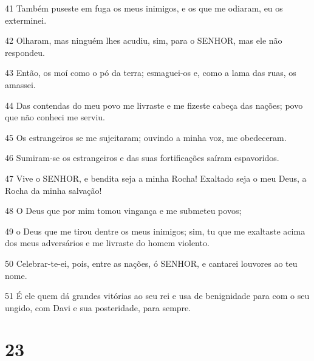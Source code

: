 \par 41 Também puseste em fuga os meus inimigos, e os que me odiaram, eu os exterminei.
\par 42 Olharam, mas ninguém lhes acudiu, sim, para o SENHOR, mas ele não respondeu.
\par 43 Então, os moí como o pó da terra; esmaguei-os e, como a lama das ruas, os amassei.
\par 44 Das contendas do meu povo me livraste e me fizeste cabeça das nações; povo que não conheci me serviu.
\par 45 Os estrangeiros se me sujeitaram; ouvindo a minha voz, me obedeceram.
\par 46 Sumiram-se os estrangeiros e das suas fortificações saíram espavoridos.
\par 47 Vive o SENHOR, e bendita seja a minha Rocha! Exaltado seja o meu Deus, a Rocha da minha salvação!
\par 48 O Deus que por mim tomou vingança e me submeteu povos;
\par 49 o Deus que me tirou dentre os meus inimigos; sim, tu que me exaltaste acima dos meus adversários e me livraste do homem violento.
\par 50 Celebrar-te-ei, pois, entre as nações, ó SENHOR, e cantarei louvores ao teu nome.
\par 51 É ele quem dá grandes vitórias ao seu rei e usa de benignidade para com o seu ungido, com Davi e sua posteridade, para sempre.

\chapter{23}

